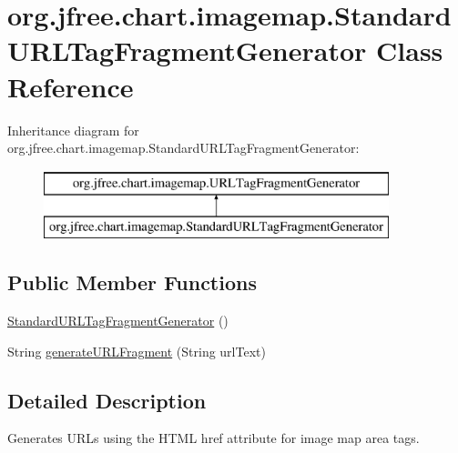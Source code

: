 \hypertarget{classorg_1_1jfree_1_1chart_1_1imagemap_1_1_standard_u_r_l_tag_fragment_generator}{}\section{org.\+jfree.\+chart.\+imagemap.\+Standard\+U\+R\+L\+Tag\+Fragment\+Generator Class Reference}
\label{classorg_1_1jfree_1_1chart_1_1imagemap_1_1_standard_u_r_l_tag_fragment_generator}
Inheritance diagram for org.\+jfree.\+chart.\+imagemap.\+Standard\+U\+R\+L\+Tag\+Fragment\+Generator\+:\begin{figure}[H]
\begin{center}
\leavevmode
\includegraphics[height=2.000000cm]{classorg_1_1jfree_1_1chart_1_1imagemap_1_1_standard_u_r_l_tag_fragment_generator}
\end{center}
\end{figure}
\subsection*{Public Member Functions}
\begin{DoxyCompactItemize}
\item 
\mbox{\hyperlink{classorg_1_1jfree_1_1chart_1_1imagemap_1_1_standard_u_r_l_tag_fragment_generator_a6fdd79bc2d54bf0aad4872efdb22d194}{Standard\+U\+R\+L\+Tag\+Fragment\+Generator}} ()
\item 
String \mbox{\hyperlink{classorg_1_1jfree_1_1chart_1_1imagemap_1_1_standard_u_r_l_tag_fragment_generator_a122e66d4498e56e6581ac4b0949caf3b}{generate\+U\+R\+L\+Fragment}} (String url\+Text)
\end{DoxyCompactItemize}


\subsection{Detailed Description}
Generates U\+R\+Ls using the H\+T\+ML href attribute for image map area tags. 

